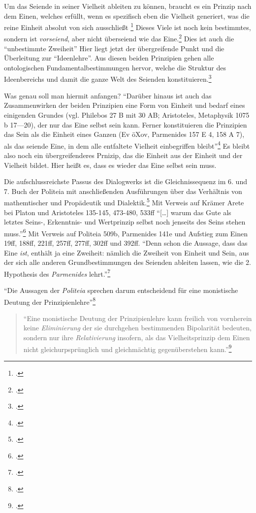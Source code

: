 \documentclass[12pt]{article}
\newcommand*{\zitatblock}[1]{%
    \begin{quote}
    \fontsize{10}{12}\selectfont
    \setlength{\parskip}{1.0em}
    #1
    \end{quote}
}
\begin{document}
Um das Seiende in seiner Vielheit ableiten zu können, braucht es ein Prinzip nach dem Einen, welches erfüllt, wenn es spezifisch eben die Vielheit generiert, was die reine Einheit absolut von sich ausschließt \footcite[vgl.][S. 103]{halfwassen2015spuren} Dieses Viele ist noch kein bestimmtes, sondern ist \emph{vorseiend}, aber nicht überseiend wie das Eine.\footcite[vgl.][S. 103]{halfwassen2015spuren} Dies ist auch die \enquote{unbestimmte Zweiheit}
Hier liegt jetzt der übergreifende Punkt und die Überleitung zur \enquote{Ideenlehre}. Aus diesen beiden Prinzipien gehen alle ontologischen Fundamentalbestimmungen hervor, welche die Struktur des Ideenbereichs und damit die ganze Welt des Seienden konstituieren.\footcite[vgl.][S. 104]{halfwassen2015spuren}

Was genau soll man hiermit anfangen? \enquote{Darüber hinaus ist auch das Zusammenwirken der beiden Prinzipien eine Form von Einheit und bedarf eines einigenden Grundes (vgl. Philebos 27 B mit 30 AB; Aristoteles, Metaphysik 1075 b 17—20), der nur das Eine selbst sein kann. Ferner konstituieren die Prinzipien das Sein als die Einheit eines Ganzen (Ev öXov, Parmenides 157 E 4, 158 A 7), als das seiende Eine, in dem alle entfaltete Vielheit einbegriffen bleibt}\footcite[][S. 106]{halfwassen2015spuren}
Es bleibt also noch ein übergreifenderes Prnizip, das die Einheit aus der Einheit und der Vielheit bildet. Hier heißt es, dass es wieder das Eine selbst sein muss.

Die aufschlussreichste Passus des Dialogwerks ist die Gleichnissequenz im 6. und 7. Buch der Politeia mit anschließenden Ausführungen über das Verhältnis von mathemtischer und Propädeutik und Dialektik.\footcite[vgl.][S. 135]{halfwassen2015spuren} Mit Verweis auf Krämer Arete bei Platon und Aristoteles 135-145, 473-480, 533ff
\enquote{[\dots] warum das Gute als letztes Seins-, Erkenntnis- und Wertprinzip selbst noch jenseits des Seins stehen muss.}\footcite[vgl.][S. 136]{halfwassen2015spuren} Mit Verweis auf Politeia 509b, Parmenides 141e und Aufstieg zum Einen 19ff, 188ff, 221ff, 257ff, 277ff, 302ff und 392ff. 
\enquote{Denn schon die Aussage, dass das Eine \emph{ist}, enthält ja eine Zweiheit: nämlich die Zweiheit von Einheit und Sein, aus der sich alle anderen Grundbestimmungen des Seienden ableiten lassen, wie die 2. Hypothesis des \emph{Parmenides} lehrt.}\footcite[][S. 136f.]{halfwassen2015spuren}

\enquote{Die Aussagen der \emph{Politeia} sprechen darum entscheidend für eine monistische Deutung der Prinzipienlehre}\footcite[][S. 137]{halfwassen2015spuren}
\zitatblock{\enquote{Eine monistische Deutung der Prinzipienlehre kann freilich von vornherein keine \emph{Eliminierung} der sie durchgehen bestimmenden Bipolarität bedeuten, sondern nur ihre \emph{Relativierung} insofern, als das Vielheitsprinzip dem Einen nicht gleichurpsprünglich und gleichmächtig gegenüberstehen kann.}\footcite[][S. 138]{halfwassen2015spuren}}
\end{document}
